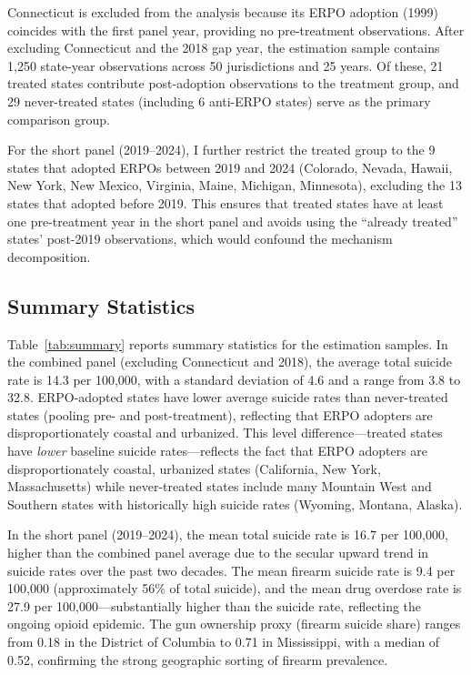 \documentclass[12pt]{article}
\begin{document}
Connecticut is excluded from the analysis because its ERPO adoption (1999) coincides with the first panel year, providing no pre-treatment observations. After excluding Connecticut and the 2018 gap year, the estimation sample contains 1,250 state-year observations across 50 jurisdictions and 25 years. Of these, 21 treated states contribute post-adoption observations to the treatment group, and 29 never-treated states (including 6 anti-ERPO states) serve as the primary comparison group.

For the short panel (2019--2024), I further restrict the treated group to the 9 states that adopted ERPOs between 2019 and 2024 (Colorado, Nevada, Hawaii, New York, New Mexico, Virginia, Maine, Michigan, Minnesota), excluding the 13 states that adopted before 2019. This ensures that treated states have at least one pre-treatment year in the short panel and avoids using the ``already treated'' states' post-2019 observations, which would confound the mechanism decomposition.

\subsection{Summary Statistics}

Table~\ref{tab:summary} reports summary statistics for the estimation samples. In the combined panel (excluding Connecticut and 2018), the average total suicide rate is 14.3 per 100,000, with a standard deviation of 4.6 and a range from 3.8 to 32.8. ERPO-adopted states have lower average suicide rates than never-treated states (pooling pre- and post-treatment), reflecting that ERPO adopters are disproportionately coastal and urbanized. This level difference---treated states have \textit{lower} baseline suicide rates---reflects the fact that ERPO adopters are disproportionately coastal, urbanized states (California, New York, Massachusetts) while never-treated states include many Mountain West and Southern states with historically high suicide rates (Wyoming, Montana, Alaska).

In the short panel (2019--2024), the mean total suicide rate is 16.7 per 100,000, higher than the combined panel average due to the secular upward trend in suicide rates over the past two decades. The mean firearm suicide rate is 9.4 per 100,000 (approximately 56\% of total suicide), and the mean drug overdose rate is 27.9 per 100,000---substantially higher than the suicide rate, reflecting the ongoing opioid epidemic. The gun ownership proxy (firearm suicide share) ranges from 0.18 in the District of Columbia to 0.71 in Mississippi, with a median of 0.52, confirming the strong geographic sorting of firearm prevalence.
\end{document}
